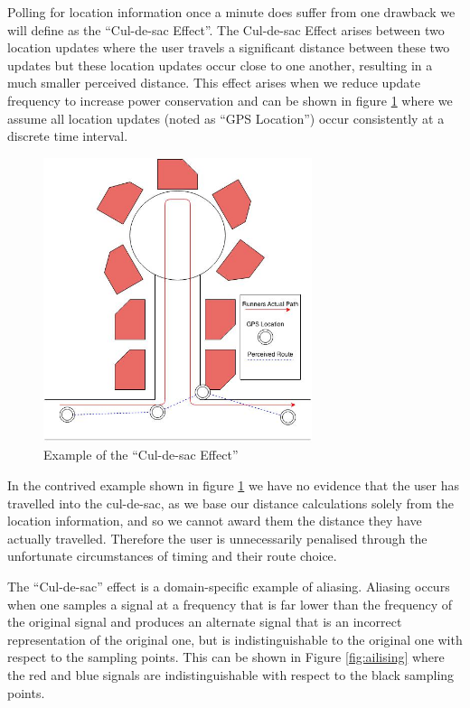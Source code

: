 Polling for location information once a minute does suffer from one
drawback we will define as the ``Cul-de-sac Effect''. The Cul-de-sac
Effect arises between two location updates where the user travels a
significant distance between these two updates but these location
updates occur close to one another, resulting in a much smaller
perceived distance. This effect arises when we reduce update
frequency to increase power conservation and can be shown in figure 
\ref{fig:cul-de-sac} where we assume all location updates (noted as
``GPS Location'') occur consistently at a discrete time interval. 

\begin{figure}[h]
  \centering
  \includegraphics[width=0.7\textwidth]{images/cul-de-sac.jpg}
  \caption{Example of the ``Cul-de-sac Effect''}
  \label{fig:cul-de-sac}
\end{figure}

In the contrived example shown in figure \ref{fig:cul-de-sac} we have
no evidence that the user has travelled into the cul-de-sac, as we
base our distance calculations solely from the location information,
and so we cannot award them the distance they have actually
travelled. Therefore the user is unnecessarily penalised through the
unfortunate circumstances of timing and their route choice. 

The ``Cul-de-sac'' effect is a domain-specific example of
aliasing. Aliasing occurs when one samples a signal at a frequency
that is far lower than the frequency of the original signal and
produces an alternate signal that is an incorrect representation of
the original one, but is indistinguishable to the original one with
respect to the sampling points. This can be shown in Figure
\ref{fig:ailising} where the red and blue signals are
indistinguishable with respect to the black sampling points.

